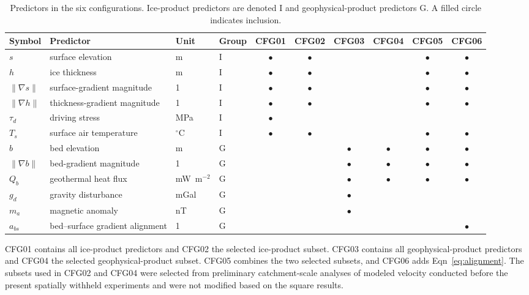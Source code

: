 \documentclass[review,jog]{igs}
\providecommand{\toprule}{\hline}
\providecommand{\midrule}{\hline}
\providecommand{\bottomrule}{\hline}
\begin{document}
\begin{table}
\caption{Predictors in the six configurations. Ice-product predictors are denoted I and geophysical-product predictors G. A filled circle indicates inclusion.}
\label{tab:configurations}
\centering
\ifdefined\FinalPass\tiny\setlength{\tabcolsep}{3pt}\else\scriptsize\fi
\begin{tabular}{llllcccccc}
\toprule
Symbol & Predictor & Unit & Group & CFG01 & CFG02 & CFG03 & CFG04 & CFG05 & CFG06\\
\midrule
$s$ & surface elevation & m & I & $\bullet$ & $\bullet$ & & & $\bullet$ & $\bullet$\\
$h$ & ice thickness & m & I & $\bullet$ & $\bullet$ & & & $\bullet$ & $\bullet$\\
$\lVert\nabla s\rVert$ & surface-gradient magnitude & 1 & I & $\bullet$ & $\bullet$ & & & $\bullet$ & $\bullet$\\
$\lVert\nabla h\rVert$ & thickness-gradient magnitude & 1 & I & $\bullet$ & $\bullet$ & & & $\bullet$ & $\bullet$\\
$\tau_d$ & driving stress & MPa & I & $\bullet$ & & & & &\\
$T_s$ & surface air temperature & $^\circ$C & I & $\bullet$ & $\bullet$ & & & $\bullet$ & $\bullet$\\
$b$ & bed elevation & m & G & & & $\bullet$ & $\bullet$ & $\bullet$ & $\bullet$\\
$\lVert\nabla b\rVert$ & bed-gradient magnitude & 1 & G & & & $\bullet$ & $\bullet$ & $\bullet$ & $\bullet$\\
$Q_b$ & geothermal heat flux & mW~m$^{-2}$ & G & & & $\bullet$ & $\bullet$ & $\bullet$ & $\bullet$\\
$g_d$ & gravity disturbance & mGal & G & & & $\bullet$ & & &\\
$m_a$ & magnetic anomaly & nT & G & & & $\bullet$ & & &\\
$a_{bs}$ & bed--surface gradient alignment & 1 & G & & & & & & $\bullet$\\
\bottomrule
\end{tabular}
\end{table}

CFG01 contains all ice-product predictors and CFG02 the selected ice-product subset. CFG03 contains all geophysical-product predictors and CFG04 the selected geophysical-product subset. CFG05 combines the two selected subsets, and CFG06 adds Eqn~\ref{eq:alignment}. The subsets used in CFG02 and CFG04 were selected from preliminary catchment-scale analyses of modeled velocity conducted before the present spatially withheld experiments and were not modified based on the square results.
\end{document}
